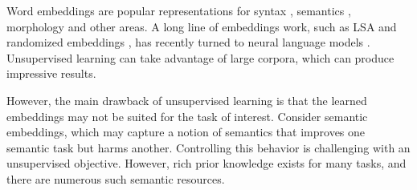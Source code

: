 \documentclass[11pt]{article}
\begin{document}
%
%
%
%

Word embeddings are popular representations for syntax \cite{turian2010word,collobert2008unified,mnih2007three}, semantics
\cite{huang2012improving,socher-EtAl:2013:EMNLP}, morphology \cite{luong2013better} and other areas.
A long line of embeddings work, such as LSA and randomized embeddings \cite{ravichandran2005randomized,van2010online},
has recently turned to neural language models \cite{bengio2006neural,collobert2008unified,turian2010word}.
Unsupervised learning can
take advantage of large corpora, which can produce impressive results.

However, the main drawback of unsupervised learning is that the learned embeddings
may not be suited for the task of interest.
Consider semantic embeddings, which may capture a notion of semantics that 
improves one semantic task but harms another.
Controlling this behavior is challenging with an unsupervised objective.
However, rich prior knowledge exists for many tasks, and there are
numerous such semantic resources.

\end{document}
